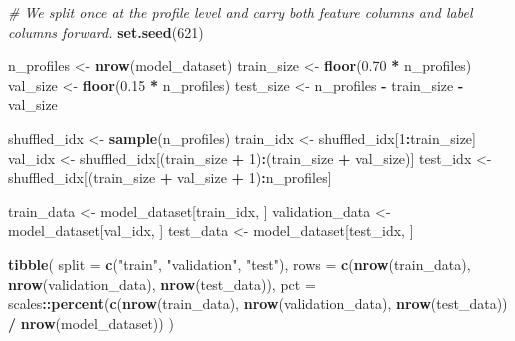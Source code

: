 \documentclass[
]{article}
\newenvironment{Shaded}{\begin{snugshade}}{\end{snugshade}}
\newcommand{\AttributeTok}[1]{\textcolor[rgb]{0.13,0.29,0.53}{#1}}
\newcommand{\CommentTok}[1]{\textcolor[rgb]{0.56,0.35,0.01}{\textit{#1}}}
\newcommand{\DecValTok}[1]{\textcolor[rgb]{0.00,0.00,0.81}{#1}}
\newcommand{\FloatTok}[1]{\textcolor[rgb]{0.00,0.00,0.81}{#1}}
\newcommand{\FunctionTok}[1]{\textcolor[rgb]{0.13,0.29,0.53}{\textbf{#1}}}
\newcommand{\NormalTok}[1]{#1}
\newcommand{\OtherTok}[1]{\textcolor[rgb]{0.56,0.35,0.01}{#1}}
\newcommand{\SpecialCharTok}[1]{\textcolor[rgb]{0.81,0.36,0.00}{\textbf{#1}}}
\newcommand{\StringTok}[1]{\textcolor[rgb]{0.31,0.60,0.02}{#1}}
\begin{document}
\begin{Shaded}
\begin{Highlighting}[]
\CommentTok{\# We split once at the profile level and carry both feature columns and label columns forward.}
\FunctionTok{set.seed}\NormalTok{(}\DecValTok{621}\NormalTok{)}

\NormalTok{n\_profiles }\OtherTok{\textless{}{-}} \FunctionTok{nrow}\NormalTok{(model\_dataset)}
\NormalTok{train\_size }\OtherTok{\textless{}{-}} \FunctionTok{floor}\NormalTok{(}\FloatTok{0.70} \SpecialCharTok{*}\NormalTok{ n\_profiles)}
\NormalTok{val\_size   }\OtherTok{\textless{}{-}} \FunctionTok{floor}\NormalTok{(}\FloatTok{0.15} \SpecialCharTok{*}\NormalTok{ n\_profiles)}
\NormalTok{test\_size  }\OtherTok{\textless{}{-}}\NormalTok{ n\_profiles }\SpecialCharTok{{-}}\NormalTok{ train\_size }\SpecialCharTok{{-}}\NormalTok{ val\_size}

\NormalTok{shuffled\_idx }\OtherTok{\textless{}{-}} \FunctionTok{sample}\NormalTok{(n\_profiles)}
\NormalTok{train\_idx }\OtherTok{\textless{}{-}}\NormalTok{ shuffled\_idx[}\DecValTok{1}\SpecialCharTok{:}\NormalTok{train\_size]}
\NormalTok{val\_idx   }\OtherTok{\textless{}{-}}\NormalTok{ shuffled\_idx[(train\_size }\SpecialCharTok{+} \DecValTok{1}\NormalTok{)}\SpecialCharTok{:}\NormalTok{(train\_size }\SpecialCharTok{+}\NormalTok{ val\_size)]}
\NormalTok{test\_idx  }\OtherTok{\textless{}{-}}\NormalTok{ shuffled\_idx[(train\_size }\SpecialCharTok{+}\NormalTok{ val\_size }\SpecialCharTok{+} \DecValTok{1}\NormalTok{)}\SpecialCharTok{:}\NormalTok{n\_profiles]}

\NormalTok{train\_data }\OtherTok{\textless{}{-}}\NormalTok{ model\_dataset[train\_idx, ]}
\NormalTok{validation\_data }\OtherTok{\textless{}{-}}\NormalTok{ model\_dataset[val\_idx, ]}
\NormalTok{test\_data }\OtherTok{\textless{}{-}}\NormalTok{ model\_dataset[test\_idx, ]}

\FunctionTok{tibble}\NormalTok{(}
  \AttributeTok{split =} \FunctionTok{c}\NormalTok{(}\StringTok{"train"}\NormalTok{, }\StringTok{"validation"}\NormalTok{, }\StringTok{"test"}\NormalTok{),}
  \AttributeTok{rows =} \FunctionTok{c}\NormalTok{(}\FunctionTok{nrow}\NormalTok{(train\_data), }\FunctionTok{nrow}\NormalTok{(validation\_data), }\FunctionTok{nrow}\NormalTok{(test\_data)),}
  \AttributeTok{pct =}\NormalTok{ scales}\SpecialCharTok{::}\FunctionTok{percent}\NormalTok{(}\FunctionTok{c}\NormalTok{(}\FunctionTok{nrow}\NormalTok{(train\_data), }\FunctionTok{nrow}\NormalTok{(validation\_data), }\FunctionTok{nrow}\NormalTok{(test\_data)) }\SpecialCharTok{/} \FunctionTok{nrow}\NormalTok{(model\_dataset))}
\NormalTok{)}
\end{Highlighting}
\end{Shaded}
\end{document}

